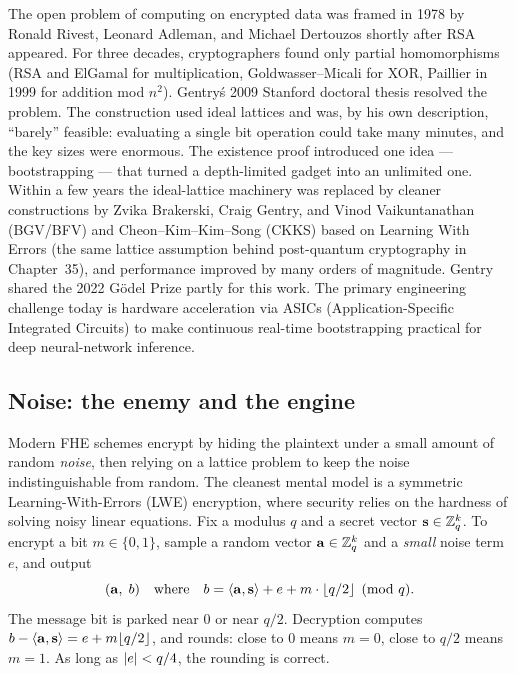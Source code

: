\begin{historybox}
The open problem of computing on encrypted data was framed in 1978 by Ronald Rivest, Leonard Adleman, and Michael Dertouzos shortly after RSA appeared. For three decades, cryptographers found only partial homomorphisms (RSA and ElGamal for multiplication, Goldwasser--Micali for XOR, Paillier in 1999 for addition mod $n^2$). Gentry\'s 2009 Stanford doctoral thesis resolved the problem. The construction used ideal lattices and was, by his own description, ``barely'' feasible: evaluating a single bit operation could take many minutes, and the key sizes were enormous. The existence proof introduced one idea --- bootstrapping --- that turned a depth-limited gadget into an unlimited one. Within a few years the ideal-lattice machinery was replaced by cleaner constructions by Zvika Brakerski, Craig Gentry, and Vinod Vaikuntanathan (BGV/BFV) and Cheon--Kim--Kim--Song (CKKS) based on Learning With Errors (the same lattice assumption behind post-quantum cryptography in Chapter~35), and performance improved by many orders of magnitude. Gentry shared the 2022 G\"odel Prize partly for this work. The primary engineering challenge today is hardware acceleration via ASICs (Application-Specific Integrated Circuits) to make continuous real-time bootstrapping practical for deep neural-network inference.
\end{historybox}

\subsection{Noise: the enemy and the engine}
\label{ch33:noise}

Modern FHE schemes encrypt by hiding the plaintext under a small amount of random \emph{noise}, then relying on a lattice problem to keep the noise indistinguishable from random. The cleanest mental model is a symmetric Learning-With-Errors (LWE) encryption, where security relies on the hardness of solving noisy linear equations. Fix a modulus $q$ and a secret vector $\mathbf{s}\in\mathbb{Z}_q^k$. To encrypt a bit $m\in\{0,1\}$, sample a random vector $\mathbf{a}\in\mathbb{Z}_q^k$ and a \emph{small} noise term $e$, and output
\[
  (\mathbf{a},\; b) \quad\text{where}\quad b = \langle \mathbf{a},\mathbf{s}\rangle + e + m\cdot \lfloor q/2\rfloor \pmod q.
\]
The message bit is parked near $0$ or near $q/2$. Decryption computes $b - \langle\mathbf{a},\mathbf{s}\rangle = e + m\lfloor q/2\rfloor$, and rounds: close to $0$ means $m=0$, close to $q/2$ means $m=1$. As long as $\lvert e\rvert < q/4$, the rounding is correct.


